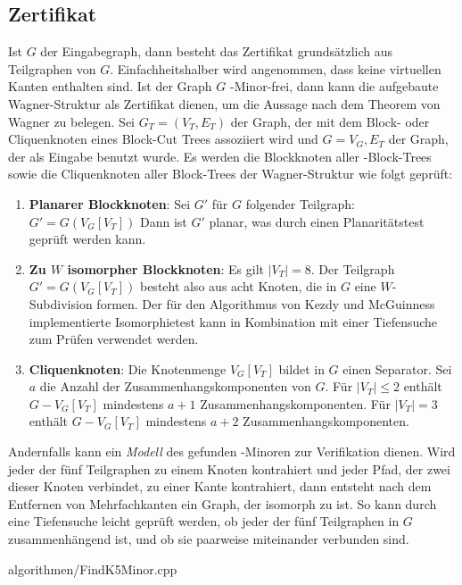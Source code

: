 \subsection{Zertifikat}
Ist $G$ der Eingabegraph, dann besteht das Zertifikat grundsätzlich aus Teilgraphen von $G$.
Einfachheitshalber wird angenommen, dass keine virtuellen Kanten enthalten sind.
Ist der Graph $G$ \kf-Minor-frei, dann kann die aufgebaute Wagner-Struktur als Zertifikat dienen, um die Aussage nach dem Theorem von Wagner \cite{Wag37} zu belegen.
Sei $G_T = (V_T, E_T)$ der Graph, der mit dem Block- oder Cliquenknoten eines Block-Cut Trees assoziiert wird und $G = V_G, E_T$ der Graph, der als Eingabe benutzt wurde.
Es werden die Blockknoten aller \dd-Block-Trees sowie die Cliquenknoten aller Block-Trees der Wagner-Struktur wie folgt geprüft:
\begin{enumerate}
  \item \textbf{Planarer Blockknoten}: Sei $G'$ für $G$ folgender Teilgraph: $G' = G(V_G[V_T])$
        Dann ist $G'$ planar, was \zB durch einen Planaritätstest geprüft werden kann.
  \item \textbf{Zu $W$ isomorpher Blockknoten}: Es gilt $\vert V_T \vert = 8$.
        Der Teilgraph $G' = G(V_G[V_T])$ besteht also aus acht Knoten, die in $G$ eine $W$-Subdivision formen.
        Der für den Algorithmus von Kezdy und McGuinness implementierte Isomorphietest kann in Kombination mit \zB einer Tiefensuche zum Prüfen verwendet werden.
  \item \textbf{Cliquenknoten}: Die Knotenmenge $V_G[V_T]$ bildet in $G$ einen Separator.
        Sei $a$ die Anzahl der Zusammenhangskomponenten von $G$.
        Für $\vert V_T \vert \leq 2$ enthält $G - V_G[V_T]$ mindestens $a+1$ Zusammenhangskomponenten.
        Für $\vert V_T \vert = 3$ enthält $G - V_G[V_T]$ mindestens $a+2$ Zusammenhangskomponenten.
\end{enumerate}

Andernfalls kann ein \emph{Modell} des gefunden \kf-Minoren zur Verifikation dienen.
Wird jeder der fünf Teilgraphen zu einem Knoten kontrahiert und jeder Pfad, der zwei dieser Knoten verbindet, zu einer Kante kontrahiert, dann entsteht nach dem Entfernen von Mehrfachkanten ein Graph, der isomorph zu \kf ist.
So kann \zB durch eine Tiefensuche leicht geprüft werden, ob jeder der fünf Teilgraphen in $G$ zusammenhängend ist, und ob sie paarweise miteinander verbunden sind.

\newpage
\begin{minipage}{\linewidth}

                {algorithmen/FindK5Minor.cpp}
\end{minipage}
